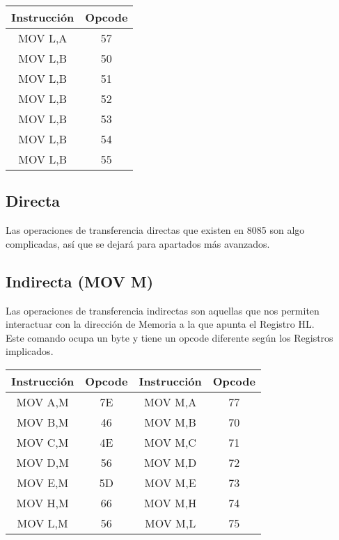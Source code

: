 \documentclass[12pt]{article}
\begin{document}
			\begin{table}[H]
				\flushleft
				\hspace{0.3cm}
				\begin{tabular}{c|c}
					Instrucción & Opcode \\
					\midrule
					MOV L,A & 57 \\
					MOV L,B & 50 \\
					MOV L,B & 51 \\
					MOV L,B & 52 \\
					MOV L,B & 53 \\
					MOV L,B & 54 \\
					MOV L,B & 55 \\
				\end{tabular}
			\end{table}
	
		\subsection{Directa}
	
			Las operaciones de transferencia directas que existen en 8085 son algo complicadas, así que se dejará para apartados más avanzados.\\
	
		\subsection{Indirecta (MOV M)}
	
			Las operaciones de transferencia indirectas son aquellas que nos permiten interactuar con la dirección de Memoria a la que apunta el Registro HL.\\
	
			Este comando ocupa un byte y tiene un opcode diferente según los Registros implicados.\\
	
			\begin{table}[H]
				\centering
				\begin{tabular}{c|c||c|c}
					Instrucción & Opcode & Instrucción & Opcode \\
					\midrule
					MOV A,M & 7E & MOV M,A & 77 \\
					MOV B,M & 46 & MOV M,B & 70 \\
					MOV C,M & 4E & MOV M,C & 71 \\
					MOV D,M & 56 & MOV M,D & 72 \\
					MOV E,M & 5D & MOV M,E & 73 \\
					MOV H,M & 66 & MOV M,H & 74 \\
					MOV L,M & 56 & MOV M,L & 75 \\
				\end{tabular}
			\end{table}
	
\end{document}
